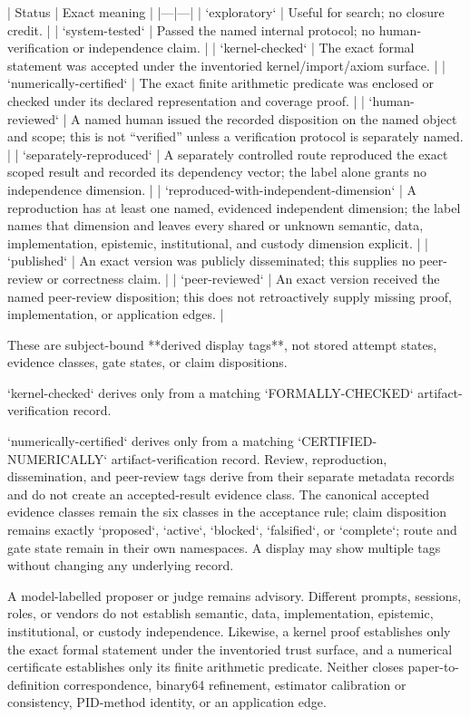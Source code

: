 \documentclass[11pt]{article}
\begin{document}
\begin{markdown}
| Status | Exact meaning |
|---|---|
| `exploratory` | Useful for search; no closure credit. |
| `system-tested` | Passed the named internal protocol; no human-verification or independence claim. |
| `kernel-checked` | The exact formal statement was accepted under the inventoried kernel/import/axiom surface. |
| `numerically-certified` | The exact finite arithmetic predicate was enclosed or checked under its declared representation and coverage proof. |
| `human-reviewed` | A named human issued the recorded disposition on the named object and scope; this is not “verified” unless a verification protocol is separately named. |
| `separately-reproduced` | A separately controlled route reproduced the exact scoped result and recorded its dependency vector; the label alone grants no independence dimension. |
| `reproduced-with-independent-dimension` | A reproduction has at least one named, evidenced independent dimension; the label names that dimension and leaves every shared or unknown semantic, data, implementation, epistemic, institutional, and custody dimension explicit. |
| `published` | An exact version was publicly disseminated; this supplies no peer-review or correctness claim. |
| `peer-reviewed` | An exact version received the named peer-review disposition; this does not retroactively supply missing proof, implementation, or application edges. |

These are subject-bound **derived display tags**, not stored attempt states, evidence classes, gate
states, or claim dispositions.

`kernel-checked` derives only from a matching `FORMALLY-CHECKED` artifact-verification record.

`numerically-certified` derives only from a matching `CERTIFIED-NUMERICALLY`
artifact-verification record. Review, reproduction, dissemination, and peer-review tags derive from
their separate metadata records and do not create an accepted-result evidence class. The
canonical accepted evidence classes remain the six classes in the acceptance rule; claim
disposition remains exactly `proposed`, `active`, `blocked`, `falsified`, or `complete`; route and
gate state remain in their own namespaces. A display may show multiple tags without changing any
underlying record.

A model-labelled proposer or judge remains advisory. Different prompts, sessions, roles, or vendors
do not establish semantic, data, implementation, epistemic, institutional, or custody independence.
Likewise, a kernel proof establishes only the exact formal statement under the inventoried trust
surface, and a numerical certificate establishes only its finite arithmetic predicate. Neither
closes paper-to-definition correspondence, binary64 refinement, estimator calibration or
consistency, PID-method identity, or an application edge.


\end{markdown}
\end{document}
